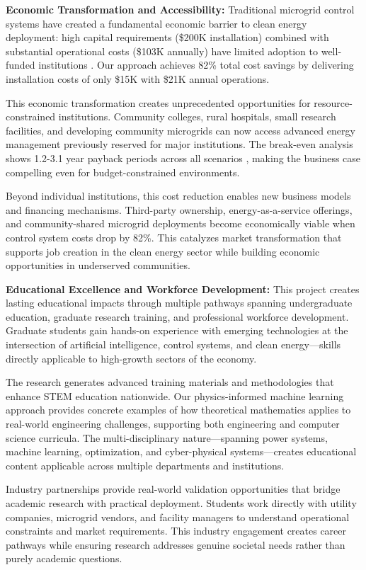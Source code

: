 \documentclass[12pt]{article}
\begin{document}
\textbf{Economic Transformation and Accessibility:} Traditional microgrid control systems have created a fundamental economic barrier to clean energy deployment: high capital requirements (\$200K installation) combined with substantial operational costs (\$103K annually) have limited adoption to well-funded institutions \cite{hirsch2018,sigrin2019}. Our approach achieves 82\% total cost savings \cite{our2024economic} by delivering installation costs of only \$15K with \$21K annual operations.

This economic transformation creates unprecedented opportunities for resource-constrained institutions. Community colleges, rural hospitals, small research facilities, and developing community microgrids can now access advanced energy management previously reserved for major institutions. The break-even analysis shows 1.2-3.1 year payback periods across all scenarios \cite{our2024economic}, making the business case compelling even for budget-constrained environments.

Beyond individual institutions, this cost reduction enables new business models and financing mechanisms. Third-party ownership, energy-as-a-service offerings, and community-shared microgrid deployments become economically viable when control system costs drop by 82\%. This catalyzes market transformation that supports job creation in the clean energy sector while building economic opportunities in underserved communities.

\textbf{Educational Excellence and Workforce Development:} This project creates lasting educational impacts through multiple pathways spanning undergraduate education, graduate research training, and professional workforce development. Graduate students gain hands-on experience with emerging technologies at the intersection of artificial intelligence, control systems, and clean energy—skills directly applicable to high-growth sectors of the economy.

The research generates advanced training materials and methodologies that enhance STEM education nationwide. Our physics-informed machine learning approach provides concrete examples of how theoretical mathematics applies to real-world engineering challenges, supporting both engineering and computer science curricula. The multi-disciplinary nature—spanning power systems, machine learning, optimization, and cyber-physical systems—creates educational content applicable across multiple departments and institutions.

Industry partnerships provide real-world validation opportunities that bridge academic research with practical deployment. Students work directly with utility companies, microgrid vendors, and facility managers to understand operational constraints and market requirements. This industry engagement creates career pathways while ensuring research addresses genuine societal needs rather than purely academic questions.
\end{document}
